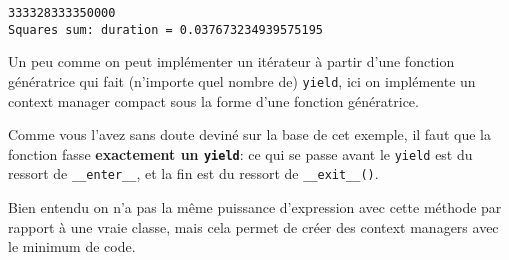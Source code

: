     \begin{Verbatim}[commandchars=\\\{\}]
333328333350000
Squares sum: duration = 0.037673234939575195

    \end{Verbatim}

    Un peu comme on peut implémenter un itérateur à partir d'une fonction
génératrice qui fait (n'importe quel nombre de) \texttt{yield}, ici on
implémente un context manager compact sous la forme d'une fonction
génératrice.

Comme vous l'avez sans doute deviné sur la base de cet exemple, il faut
que la fonction fasse \textbf{exactement un \texttt{yield}}: ce qui se
passe avant le \texttt{yield} est du ressort de \texttt{\_\_enter\_\_},
et la fin est du ressort de \texttt{\_\_exit\_\_()}.

Bien entendu on n'a pas la même puissance d'expression avec cette
méthode par rapport à une vraie classe, mais cela permet de créer des
context managers avec le minimum de code.


    
    
    

